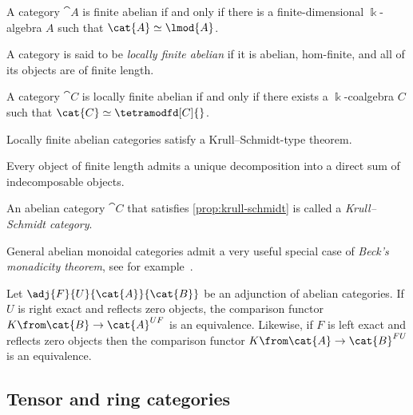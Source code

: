 \begin{lemma}
  A category \(\cat{A}\) is finite abelian
  if and only if
  there is a finite\hyp{}dimensional \(\Bbbk\)\hyp{}algebra \(A\) such that \(\cat{A} \simeq \lmod{A}\).
\end{lemma}

\begin{definition}
  A category is said to be \emph{locally finite abelian} if
  it is abelian,
  hom-finite,
  and all of its objects are of finite length.
\end{definition}

\begin{lemma}\label{lem:campus-bar}
  A category \(\cat{C}\) is locally finite abelian
  if and only if
  there exists a \(\Bbbk\)\hyp{}coalgebra \(C\) such that \(\cat{C} \simeq \tetramodfd[C]{}\).
\end{lemma}

Locally finite abelian categories satisfy a Krull--Schmidt-type theorem.

\begin{proposition}\label{prop:krull-schmidt}
  Every object of finite length admits a unique decomposition into a direct sum of indecomposable objects.
\end{proposition}

\begin{definition}\label{def:krull-schmidt-category}
  An abelian category \(\cat{C}\) that satisfies \cref{prop:krull-schmidt} is called a \emph{Krull--Schmidt category}.
\end{definition}

General abelian monoidal categories admit a very useful special case of \emph{Beck's monadicity theorem},
see for example~\cite[Section~4.1]{ben-zvi18:integ}.

\begin{theorem}\label{thm:SmallBeck}
  Let \(\adj{F}{U}{\cat{A}}{\cat{B}}\) be an adjunction of abelian categories.
  If \(U\) is right exact and reflects zero objects,
  the comparison functor \(K \from \cat{B} \to \cat{A}^{UF}\) is an equivalence.
  Likewise, if \(F\) is left exact and reflects zero objects
  then the comparison functor \(K\from \cat{A} \to \cat{B}^{FU}\) is an equivalence.
\end{theorem}

\subsection{Tensor and ring categories}

